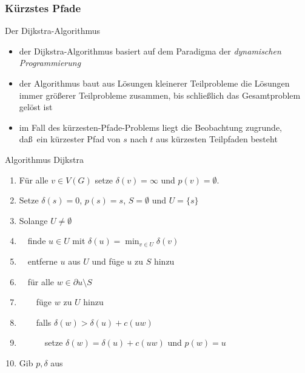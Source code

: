 \documentclass[aspectratio=1610, 11pt]{beamer}
\newcommand{\mytitle}{K\"urzstes Pfade}
\begin{document}
\begin{frame}\frametitle{\mytitle}
	\begin{overprint}
\begin{exampleblock}{Der Dijkstra-Algorithmus}
		\begin{itemize}
			\item der Dijkstra-Algorithmus basiert auf dem Paradigma der \emph{dynamischen Programmierung}
			\item der Algorithmus baut aus L\"osungen kleinerer Teilprobleme die L\"osungen immer gr\"o\ss erer Teilprobleme zusammen, bis schlie\ss lich das Gesamtproblem gel\"ost ist
			\item im Fall des k\"urzesten-Pfade-Problems liegt die Beobachtung zugrunde, da\ss\ ein k\"urzester Pfad von $s$ nach $t$ aus k\"urzesten Teilpfaden besteht
		\end{itemize}
	\end{exampleblock}
\begin{exampleblock}{Algorithmus Dijkstra}
		\begin{enumerate}
			\item F\"ur alle $v\in V(G)$ setze $\delta(v)=\infty$ und $p(v)=\emptyset$.
			\item Setze $\delta(s)=0$, $p(s)=s$, $S=\emptyset$ und $U=\{s\}$
			\item Solange $U\neq\emptyset$
			\item $\quad$finde $u\in U$ mit $\delta(u)=\min_{v\in U}\delta(v)$
			\item $\quad$entferne $u$ aus $U$ und f\"uge $u$ zu $S$ hinzu
			\item $\quad$f\"ur alle $w\in\partial u\setminus S$\\
			\item $\qquad$f\"uge $w$ zu $U$ hinzu
			\item $\qquad$falls $\delta(w)>\delta(u)+c(uw)$
			\item $\qquad\quad$setze $\delta(w)=\delta(u)+c(uw)$ und $p(w)=u$
			\item Gib $p,\delta$ aus
		\end{enumerate}
	\end{exampleblock}
	\end{overprint}
\end{frame}
\end{document}

